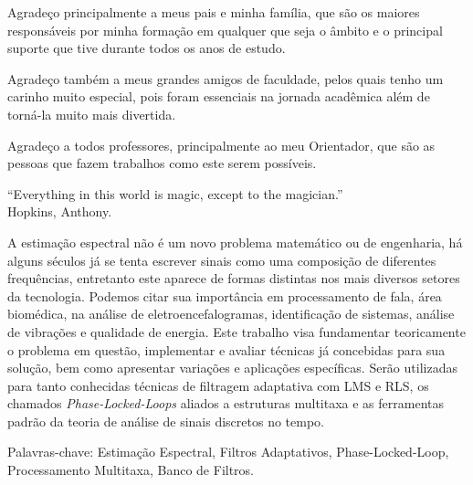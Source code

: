 \documentclass[
12pt,
openany, %
oneside, %
a4paper,			
english,			
brazil			        %
]{abntbibufjf}
\begin{document}
	
	\begin{agradecimentos}
		
	Agradeço principalmente a meus pais e minha família, que são os maiores responsáveis por minha formação em qualquer que seja o âmbito e o principal suporte que tive durante todos os anos de estudo. 
	
	Agradeço também a meus grandes amigos de faculdade, pelos quais tenho um carinho muito especial, pois foram essenciais na jornada acadêmica além de torná-la muito mais divertida.
	
	Agradeço a todos professores, principalmente ao meu Orientador, que são as pessoas que fazem trabalhos como este serem possíveis.
		
		
		
		
	\end{agradecimentos}
	
	\begin{epigrafe}
		\vspace*{\fill}
		\begin{flushright}
			``Everything in this world is magic, except to the magician.''\\
			Hopkins, Anthony.
		\end{flushright}
	\end{epigrafe}
	
	
	
	\setlength{\absparsep}{18pt} 
	\begin{resumo}
		
		A estimação espectral não é um novo problema matemático ou de engenharia, há alguns séculos já se tenta escrever sinais como uma composição de diferentes frequências, entretanto este aparece de formas distintas nos mais diversos setores da tecnologia. Podemos citar sua importância em processamento de fala, área biomédica, na análise de eletroencefalogramas, identificação de sistemas, análise de vibrações e qualidade de energia. Este trabalho visa fundamentar teoricamente o problema em questão, implementar e avaliar técnicas já concebidas para sua solução, bem como apresentar variações e aplicações específicas. Serão utilizadas para tanto conhecidas técnicas de filtragem adaptativa com LMS e RLS, os chamados \textit{Phase-Locked-Loops} aliados a estruturas multitaxa e as ferramentas padrão da teoria de análise de sinais discretos no tempo. 
		
		
		
		
		Palavras-chave: Estimação Espectral, Filtros Adaptativos, Phase-Locked-Loop, Processamento Multitaxa, Banco de Filtros.
		
	\end{resumo}
\end{document}
